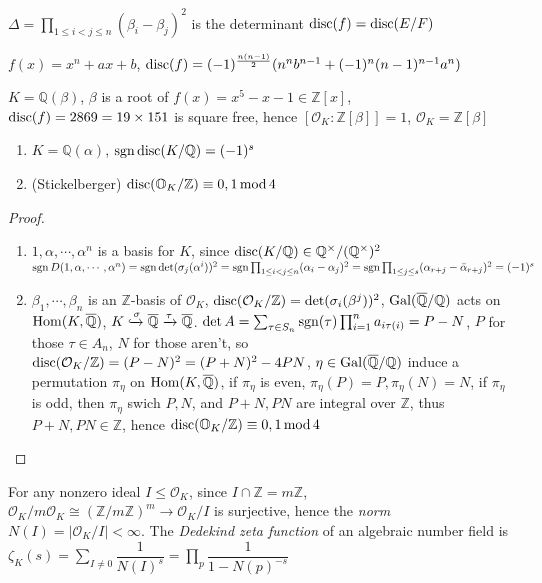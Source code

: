 \documentclass[main]{subfiles}
\begin{document}
\begin{remark}
$\Delta=\prod_{1\leq i<j\leq n}(\beta_i-\beta_j)^2$ is the determinant $\operatorname{disc}(f)=\operatorname{disc}(E/F)$
\end{remark}

\begin{lemma}
$f(x)=x^n+ax+b$, $\operatorname{disc}(f)=(-1)^{\frac{n(n-1)}{2}}(n^nb^{n-1}+(-1)^n(n-1)^{n-1}a^n)$
\end{lemma}

\begin{example}
$K=\mathbb Q(\beta)$, $\beta$ is a root of $f(x)=x^5-x-1\in\mathbb Z[x]$, $\operatorname{disc}(f)=2869=19\times151$ is square free, hence $[\mathcal O_K:\mathbb Z[\beta]]=1$, $\mathcal O_K=\mathbb Z[\beta]$
\end{example}

\begin{proposition} \hfill
\begin{enumerate}[label=(\arabic*)]
\item $K=\mathbb Q(\alpha)$, $\operatorname{sgn}\operatorname{disc}(K/\mathbb Q)=(-1)^s$
\item (Stickelberger) $\operatorname{disc}(\mathbb O_K/\mathbb Z)\equiv0,1\,\mathrm{mod}\,4$
\end{enumerate}
\end{proposition}

\begin{proof} \hfill
\begin{enumerate}[label=(\arabic*)]
\item $1,\alpha,\cdots,\alpha^n$ is a basis for $K$, since $\operatorname{disc}(K/\mathbb Q)\in\mathbb Q^\times/(\mathbb Q^\times)^2$ $\operatorname{sgn} D(1,\alpha,\cdots,\alpha^n)=\operatorname{sgn}\det(\sigma_j(\alpha^i))^2=\operatorname{sgn}\prod_{1\leq i<j\leq n}(\alpha_i-\alpha_j)^2=\operatorname{sgn}\prod_{1\leq j\leq s}(\alpha_{r+j}-\bar\alpha_{r+j})^2=(-1)^s$
\item $\beta_1,\cdots,\beta_n$ is an $\mathbb Z$-basis of $\mathcal O_K$, $\operatorname{disc}(\mathcal O_K/\mathbb Z)=\det(\sigma_i(\beta^j))^2$, $\operatorname{Gal}(\overline{\mathbb Q}/\mathbb Q)$ acts on $\operatorname{Hom}(K,\overline{\mathbb Q})$, $K\xhookrightarrow{\sigma}\overline{\mathbb Q}\xrightarrow\tau\overline{\mathbb Q}$. $\det A=\sum_{\tau\in S_n}\operatorname{sgn}(\tau)\prod_{i=1}^na_{i\tau(i)}=P-N$, $P$ for those $\tau\in A_n$, $N$ for those aren't, so $\operatorname{disc}(\mathcal O_K/\mathbb Z)=(P-N)^2=(P+N)^2-4PN$, $\eta\in\operatorname{Gal}(\overline{\mathbb Q}/\mathbb Q)$ induce a permutation $\pi_\eta$ on $\operatorname{Hom}(K,\overline{\mathbb Q})$, if $\pi_\eta$ is even, $\pi_\eta(P)=P,\pi_\eta(N)=N$, if $\pi_\eta$ is odd, then $\pi_\eta$ swich $P,N$, and $P+N,PN$ are integral over $\mathbb Z$, thus $P+N,PN\in\mathbb Z$, hence $\operatorname{disc}(\mathbb O_K/\mathbb Z)\equiv0,1\,\mathrm{mod}\,4$
\end{enumerate}
\end{proof}

\begin{definition}
For any nonzero ideal $I\leq\mathcal O_K$, since $I\cap \mathbb Z=m\mathbb Z$, $\mathcal O_K/m\mathcal O_K\cong(\mathbb Z/m\mathbb Z)^m\to\mathcal O_K/I$ is surjective, hence the \textit{norm} $N(I)=|\mathcal O_K/I|<\infty$. The \textit{Dedekind zeta function} of an algebraic number field is $\zeta_K(s)=\displaystyle\sum_{I\neq0}\dfrac{1}{N(I)^s}=\prod_{p}\dfrac{1}{1-N(p)^{-s}}$
\end{definition}
\end{document}
